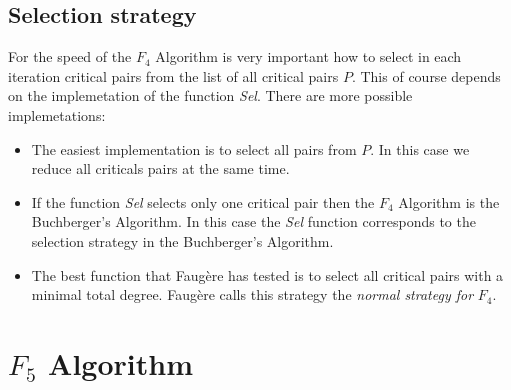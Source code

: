\subsection{Selection strategy}
\label{subsec:F4:sel}
For the speed of the $F_4$ Algorithm is very important how to select in each iteration critical pairs from the list of all critical pairs $P$. This of course depends on the implemetation of the function \textit{Sel}. There are more possible implemetations:

\begin{itemize}
  \item The easiest implementation is to select all pairs from $P$. In this case we reduce all criticals pairs at the same time.
  \item If the function \textit{Sel} selects only one critical pair then the $F_4$ Algorithm is the Buchberger's Algorithm. In this case the \textit{Sel} function corresponds to the selection strategy in the Buchberger's Algorithm.
  \item The best function that Faug\`ere has tested is to select all critical pairs with a minimal total degree. Faug\`ere calls this strategy the \textit{normal strategy for} $F_4$.
\end{itemize}

\section{$F_5$ Algorithm}
